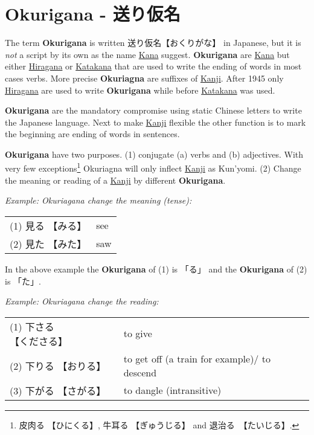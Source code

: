 \section{Okurigana - 送り仮名} \label{sec:Okurigana}

The term \textbf{Okurigana} is written {送り仮名}{【おくりがな】} in Japanese,
but it is \textit{not} a script by its own as the name
\hyperref[sec:Kana]{Kana} suggest.  \textbf{Okurigana} are
\hyperref[sec:Kana]{Kana} but either \hyperref[sec:Hiragana]{Hiragana} or
\hyperref[sec:Katakana]{Katakana} that are used to write the ending of words in
most cases verbs. More precise \textbf{Okuriagna} are suffixes of
\hyperref[sec:Kanji]{Kanji}. After 1945 only
\hyperref[sec:Hiragagana]{Hiragana} are used to write \textbf{Okurigana} while
before \hyperref[sec:Katakana]{Katakana} was used. 

\textbf{Okurigana} are the mandatory compromise using static Chinese letters to
write the Japanese language. Next to make \hyperref[sec:Kanji]{Kanji} flexible
the other function is to mark the beginning are ending of words in sentences. 

\textbf{Okurigana} have two purposes. (1) conjugate (a) verbs and (b)
adjectives. With very few exceptions\footnote{ {皮肉る} {【ひにくる】},
{牛耳る}  {【ぎゅうじる】} and {退治る}　{【たいじる】}.}  Okuriagna will only
inflect \hyperref[sec:Kanji]{Kanji} as Kun'yomi.  (2) Change the meaning or
reading of a \hyperref[sec:Kanji]{Kanji} by different \textbf{Okurigana}.

\textit{Example: Okuriagana change the meaning (tense):}

\begin{center}\begin{tabular}{ll}
(1) {見る} {【みる】} & see \\
(2) {見た} {【みた】} & saw \\
\end{tabular}\end{center}

In the above example the \textbf{Okurigana} of (1) is {「る」} and the
\textbf{Okurigana} of (2) is {「た」}.

\textit{Example: Okuriagana change the reading:}

\begin{center}\begin{tabular}{ll}
(1) {下さる} {【くださる】} & to give \\
(2) {下りる} {【おりる】} &  to get off (a train for example)/ to descend \\
(3) {下がる} {【さがる】} &  to dangle (intransitive)\\
\end{tabular}\end{center}

